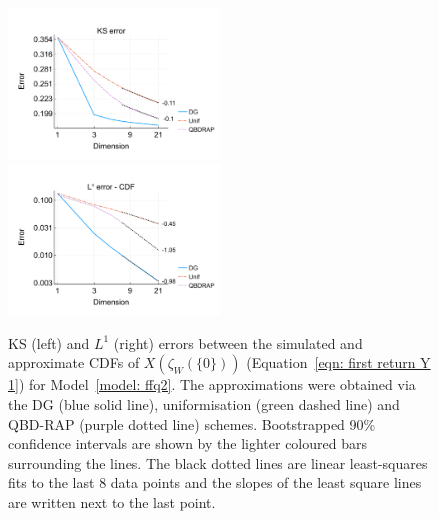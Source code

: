 \begin{figure}[h]
	\centering
	\includegraphics[width=0.5\textwidth,trim={0.75cm 0.8cm 0.25cm 1.25cm},clip]{chapter6/figs/ffq/discts/ks_error_formatted.pdf}%
	\includegraphics[width=0.5\textwidth,trim={0.75cm 0.8cm 0.25cm 1.25cm},clip]{chapter6/figs/ffq/discts/l1_cdf_error_formatted.pdf}
	\caption{KS (left) and \(L^1\) (right) errors between the simulated and approximate CDFs of \(X(\zeta_{W}(\{0\}))\) (Equation~\ref{eqn: first return Y 1}) for Model~\ref{model: ffq2}. The approximations were obtained via the DG (blue solid line), uniformisation (green dashed line) and QBD-RAP (purple dotted line) schemes. Bootstrapped 90\% confidence intervals are shown by the lighter coloured bars surrounding the lines. The black dotted lines are linear least-squares fits to the last 8 data points and the slopes of the least square lines are written next to the last point.} 
	\label{fig: ffq return discts} 
\end{figure} 
